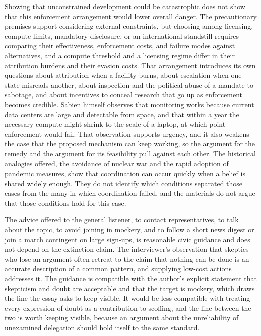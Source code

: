 \documentclass[11pt]{article}
\begin{document}
Showing that unconstrained development could be catastrophic does not show that this enforcement arrangement would lower overall danger. The precautionary premises support considering external constraints, but choosing among licensing, compute limits, mandatory disclosure, or an international standstill requires comparing their effectiveness, enforcement costs, and failure modes against alternatives, and a compute threshold and a licensing regime differ in their attribution burdens and their evasion costs. That arrangement introduces its own questions about attribution when a facility burns, about escalation when one state misreads another, about inspection and the political abuse of a mandate to sabotage, and about incentives to conceal research that go up as enforcement becomes credible. Sabien himself observes that monitoring works because current data centers are large and detectable from space, and that within a year the necessary compute might shrink to the scale of a laptop, at which point enforcement would fail. That observation supports urgency, and it also weakens the case that the proposed mechanism can keep working, so the argument for the remedy and the argument for its feasibility pull against each other. The historical analogies offered, the avoidance of nuclear war and the rapid adoption of pandemic measures, show that coordination can occur quickly when a belief is shared widely enough. They do not identify which conditions separated those cases from the many in which coordination failed, and the materials do not argue that those conditions hold for this case.

The advice offered to the general listener, to contact representatives, to talk about the topic, to avoid joining in mockery, and to follow a short news digest or join a march contingent on large sign-ups, is reasonable civic guidance and does not depend on the extinction claim. The interviewer's observation that skeptics who lose an argument often retreat to the claim that nothing can be done is an accurate description of a common pattern, and supplying low-cost actions addresses it. The guidance is compatible with the author's explicit statement that skepticism and doubt are acceptable and that the target is mockery, which draws the line the essay asks to keep visible. It would be less compatible with treating every expression of doubt as a contribution to scoffing, and the line between the two is worth keeping visible, because an argument about the unreliability of unexamined delegation should hold itself to the same standard.
\end{document}
